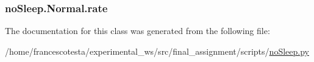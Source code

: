 \subsubsection[{\texorpdfstring{rate}{rate}}]{\setlength{\rightskip}{0pt plus 5cm}no\+Sleep.\+Normal.\+rate\hspace{0.3cm}{\ttfamily [static]}}\hypertarget{classnoSleep_1_1Normal_ac888ccee4346d4596fc6d96d1659afa1}{}\label{classnoSleep_1_1Normal_ac888ccee4346d4596fc6d96d1659afa1}


The documentation for this class was generated from the following file\+:\begin{DoxyCompactItemize}
\item 
/home/francescotesta/experimental\+\_\+ws/src/final\+\_\+assignment/scripts/\hyperlink{noSleep_8py}{no\+Sleep.\+py}\end{DoxyCompactItemize}
